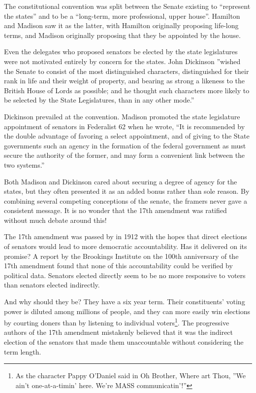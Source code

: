 \documentclass{article}
\begin{document}
The constitutional convention was split between the Senate existing to “represent the states” and to be a “long-term, more professional, upper house”. Hamilton and Madison saw it as the latter, with Hamilton originally proposing life-long terms, and Madison originally proposing that they be appointed by the house.

Even the delegates who proposed senators be elected by the state legislatures were not motivated entirely by concern for the states. John Dickinson ”wished the Senate to consist of the most distinguished characters, distinguished for their rank in life and their weight of property, and bearing as strong a likeness to the British House of Lords as possible; and he thought such characters more likely to be selected by the State Legislatures, than in any other mode.”\cite{Madison}

Dickinson prevailed at the convention. Madison promoted the state legislature appointment of senators in Federalist 62 when he wrote, “It is recommended by the double advantage of favoring a select appointment, and of giving to the State governments such an agency in the formation of the federal government as must secure the authority of the former, and may form a convenient link between the two systems.”\cite{Federalist62}

Both Madison and Dickinson cared about securing a degree of agency for the states, but they often presented it as an added bonus rather than sole reason. By combining several competing conceptions of the senate, the framers never gave a consistent message. It is no wonder that the 17th amendment was ratified without much debate around this!

The 17th amendment was passed by in 1912 with the hopes that direct elections of senators would lead to more democratic accountability\cite{Eisinger}. Has it delivered on its promise? A report by the Brookings Institute on the 100th anniversary of the 17th amendment found that none of this accountability could be verified by political data\cite{Schiller}. Senators elected directly seem to be no more responsive to voters than senators elected indirectly.

And why should they be? They have a six year term. Their constituents' voting power is diluted among millions of people, and they can more easily win elections by courting doners than by listening to individual voters\footnote{As the character Pappy O'Daniel said in Oh Brother, Where art Thou, ”We ain't one-at-a-timin' here. We're MASS communicatin'!”}. The progressive authors of the 17th amendment mistakenly believed that it was the indirect election of the senators that made them unaccountable without considering the term length.
\end{document}
